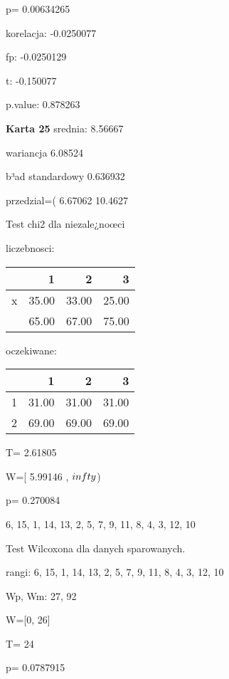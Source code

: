 \documentclass[a4paper,12pt]{article}
\begin{document}
\begin{multicols}{3}
  p= 0.00634265 \vspace{1cm} 

  korelacja: -0.0250077
     
     fp: -0.0250129
     
     t: -0.150077
     
     p.value: 0.878263 \vspace{1cm} 

  \textbf{Karta  25 } 
 srednia: 8.56667 
     
     wariancja 6.08524  
     
     b³ad standardowy 0.636932 
     
     przedzial=( 6.67062 10.4627 \vspace{1cm} 

  Test chi2 dla niezale¿noœci 
   
   liczebnosci: %
\begin{tabular}{rrrr}
  \hline
 & 1 & 2 & 3 \\
  \hline
x & 35.00 & 33.00 & 25.00 \\
   & 65.00 & 67.00 & 75.00 \\
   \hline
\end{tabular}
 
   
   oczekiwane: %
\begin{tabular}{rrrr}
  \hline
 & 1 & 2 & 3 \\
  \hline
1 & 31.00 & 31.00 & 31.00 \\
  2 & 69.00 & 69.00 & 69.00 \\
   \hline
\end{tabular}
 
   
   T= 2.61805 
   
   W=[ 5.99146 , $\\infty$) 
   
   p= 0.270084 \vspace{1cm} 

  6, 15, 1, 14, 13, 2, 5, 7, 9, 11, 8, 4, 3, 12, 10 

  Test Wilcoxona dla danych sparowanych. 
  
  rangi: 6, 15, 1, 14, 13, 2, 5, 7, 9, 11, 8, 4, 3, 12, 10 
  
  Wp, Wm:  27,  92 
  
  W=[0, 26]  
  
  T=  24 
  
  p= 0.0787915 \vspace{1cm} 


\end{multicols}
\end{document}
